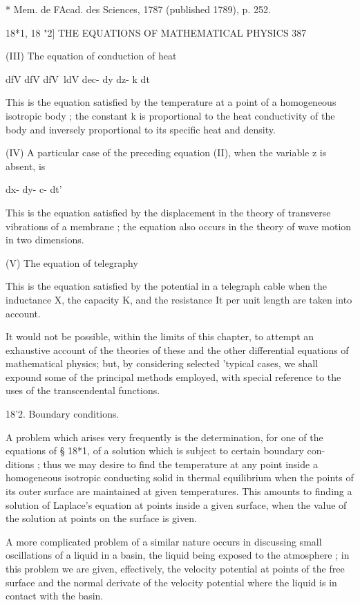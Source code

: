 * Mem. de FAcad. des Sciences, 1787 (published 1789), p. 252.



18*1, 18 "2] THE EQUATIONS OF MATHEMATICAL PHYSICS 387

(III) The equation of conduction of heat

dfV dfV dfV\ ldV dec- dy dz- k dt

This is the equation satisfied by the temperature at a point of a
homogeneous isotropic body ; the constant k is proportional to the
heat conductivity of the body and inversely proportional to its
specific heat and density.

(IV) A particular case of the preceding equation (II), when the
variable z is absent, is

dx- dy- c- dt'

This is the equation satisfied by the displacement in the theory of
transverse vibrations of a membrane ; the equation also occurs in the
theory of wave motion in two dimensions.

(V) The equation of telegraphy

This is the equation satisfied by the potential in a telegraph cable
when the inductance X, the capacity K, and the resistance It per unit
length are taken into account.

It would not be possible, within the limits of this chapter, to
attempt an exhaustive account of the theories of these and the other
differential equations of mathematical physics; but, by considering
selected 'typical cases, we shall expound some of the principal
methods employed, with special reference to the uses of the
transcendental functions.

18'2. Boundary conditions.

A problem which arises very frequently is the determination, for one
of the equations of § 18*1, of a solution which is subject to certain
boundary con- ditions ; thus we may desire to find the temperature at
any point inside a homogeneous isotropic conducting solid in thermal
equilibrium when the points of its outer surface are maintained at
given temperatures. This amounts to finding a solution of Laplace's
equation at points inside a given surface, when the value of the
solution at points on the surface is given.

A more complicated problem of a similar nature occurs in discussing
small oscillations of a liquid in a basin, the liquid being exposed to
the atmosphere ; in this problem we are given, effectively, the
velocity potential at points of the free surface and the normal
derivate of the velocity potential where the liquid is in contact with
the basin.

